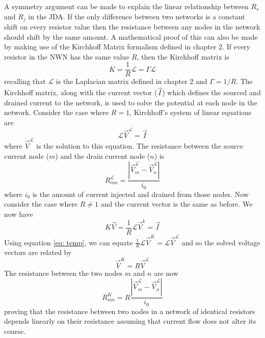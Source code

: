 A symmetry argument can be made to explain the linear relationship between $R_s$ and $R_j$ in the JDA. If the only difference between two networks is a constant shift on every resistor value then the resistance between any nodes in the network should shift by the same amount. A mathematical proof of this can also be made by making use of the Kirchhoff Matrix formalism\cite{pozrikidis} defined in chapter 2. If every resistor in the NWN has the same value $R$, then the Kirchhoff matrix is 
\begin{equation}
{K} = \frac{1}{R} \mathcal{L} = \Gamma \mathcal{L}
\end{equation}
recalling that $\mathcal{L}$ is the Laplacian matrix defined in chapter 2 and $\Gamma = 1/R$. The Kirchhoff matrix, along with the current vector ($\vec{I}$) which defines the sourced and drained current to the network, is used to solve the potential at each node in the network. Consider the case where $R = 1$, Kirchhoff's system of linear equations are
\begin{equation}
\mathcal{L} \vec{V}^\mathcal{L} = \vec{I} 
\label{eq: temp}
\end{equation}
where $\vec{V}^\mathcal{L}$ is the solution to this equation. The resistance between the source current node ($\textit{m}$) and the drain current node ($\textit{n}$) is
\begin{equation}
R^{\mathcal{L}}_{\textit{mn}} = \frac{| \vec{V}^\mathcal{L}_\textit{m} - \vec{V}^\mathcal{L}_\textit{n}|}{i_0}
\end{equation}
where $i_0$ is the amount of current injected and drained from those nodes. Now consider the case where $R \neq 1$ and the current vector is the same as before. We now have
\begin{equation}
K\vec{V} = \frac{1}{R}\mathcal{L}\vec{V}^k = \vec{I}
\end{equation}
Using equation \ref{eq: temp}, we can equate $ \frac{1}{R}\mathcal{L}\vec{V}^K = \mathcal{L}\vec{V}^\mathcal{L}$ and so the solved voltage vectors are related by
\begin{equation}
\vec{V}^K = R \vec{V}^\mathcal{L}
\end{equation}
The resistance between the two nodes $m$ and $n$ are now
\begin{equation}
R^K_{\textit{mn}} = R \frac{| \vec{V}^\mathcal{L}_\textit{m} - \vec{V}^\mathcal{L}_\textit{n}|}{i_0}
\end{equation}
proving that the resistance between two nodes in a network of identical resistors depends linearly on their resistance assuming that current flow does not alter its course.

